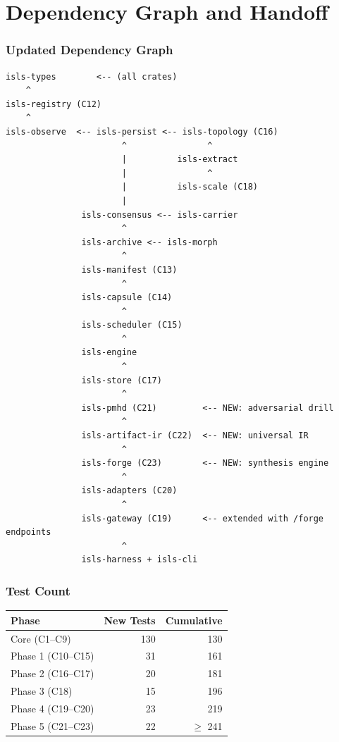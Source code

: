 \documentclass[11pt,a4paper,twoside]{article}
\theoremstyle{definition}
\theoremstyle{plain}
\theoremstyle{remark}
\begin{document}
\part{Dependency Graph and Handoff}\label{part:handoff}

\section{Updated Dependency Graph}

\begin{lstlisting}[title={Complete ISLS Dependency Graph after Phase 5}]
isls-types        <-- (all crates)
    ^
isls-registry (C12)
    ^
isls-observe  <-- isls-persist <-- isls-topology (C16)
                       ^                ^
                       |          isls-extract
                       |                ^
                       |          isls-scale (C18)
                       |
               isls-consensus <-- isls-carrier
                       ^
               isls-archive <-- isls-morph
                       ^
               isls-manifest (C13)
                       ^
               isls-capsule (C14)
                       ^
               isls-scheduler (C15)
                       ^
               isls-engine
                       ^
               isls-store (C17)
                       ^
               isls-pmhd (C21)         <-- NEW: adversarial drill
                       ^
               isls-artifact-ir (C22)  <-- NEW: universal IR
                       ^
               isls-forge (C23)        <-- NEW: synthesis engine
                       ^
               isls-adapters (C20)
                       ^
               isls-gateway (C19)      <-- extended with /forge endpoints
                       ^
               isls-harness + isls-cli
\end{lstlisting}

\section{Test Count}

\begin{tabular}{l r r}
\toprule
\textbf{Phase} & \textbf{New Tests} & \textbf{Cumulative} \\
\midrule
Core (C1--C9) & 130 & 130 \\
Phase 1 (C10--C15) & 31 & 161 \\
Phase 2 (C16--C17) & 20 & 181 \\
Phase 3 (C18) & 15 & 196 \\
Phase 4 (C19--C20) & 23 & 219 \\
Phase 5 (C21--C23) & 22 & $\ge$ 241 \\
\bottomrule
\end{tabular}
\end{document}
